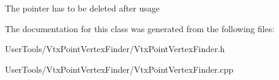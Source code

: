 The pointer has to be deleted after usage 

The documentation for this class was generated from the following files\-:\begin{DoxyCompactItemize}
\item 
User\-Tools/\-Vtx\-Point\-Vertex\-Finder/Vtx\-Point\-Vertex\-Finder.\-h\item 
User\-Tools/\-Vtx\-Point\-Vertex\-Finder/Vtx\-Point\-Vertex\-Finder.\-cpp\end{DoxyCompactItemize}
